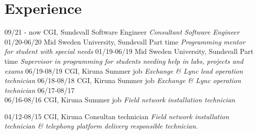 \section{Experience}

\begin{entrylist}
  \entry
    {09/21 - now}
    {CGI, Sundsvall}
    {Software Engineer}
    {\emph{Consultant Software Engineer}}
  \entry
    {01/20-06/20}
    {Mid Sweden University, Sundsvall}
    {Part time}
    {\emph{Programming mentor for student with special needs}}
  \entry
    {01/19-06/19}
    {Mid Sweden University, Sundsvall}
    {Part time}
    {\emph{Supervisor in programming for students needing help in labs, projects and \\ exams}}
  \entry
    {06/19-08/19}
    {CGI, Kiruna}
    {Summer job}
    {\emph{Exchange \& Lync lead operation technician}}
  \entry
    {06/18-08/18}
    {CGI, Kiruna}
    {Summer job}
    {\emph{Exchange \& Lync operation technician}}
  \entry
    {06/17-08/17 \\ 06/16-08/16}
    {CGI, Kiruna}
    {Summer job}
    {\emph{Field network installation technician}}

  \entry
    {04/12-08/15}
    {CGI, Kiruna}
    {Consultan technician}
    {\emph{Field network installation technician \& telephony platform delivery responsible technician.}}
\end{entrylist}
